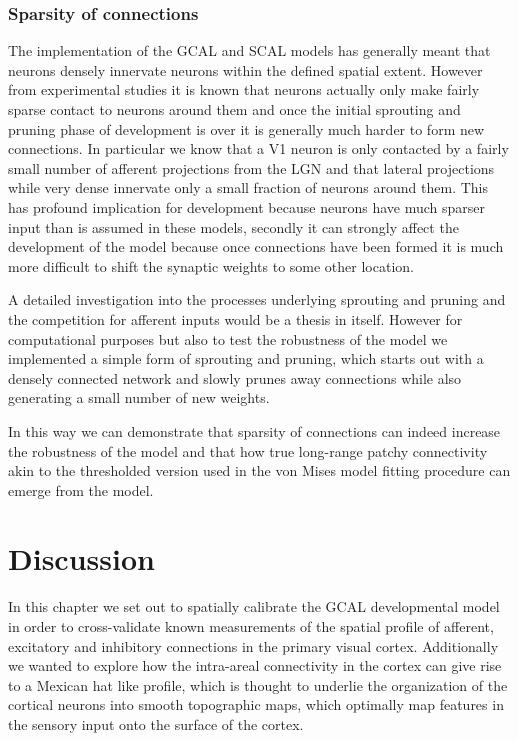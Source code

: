 \subsubsection{Sparsity of connections}

The implementation of the GCAL and SCAL models has generally meant
that neurons densely innervate neurons within the defined spatial
extent. However from experimental studies it is known that neurons
actually only make fairly sparse contact to neurons around them and
once the initial sprouting and pruning phase of development is over it
is generally much harder to form new connections. In particular we
know that a V1 neuron is only contacted by a fairly small number of
afferent projections from the LGN and that lateral projections while
very dense innervate only a small fraction of neurons around
them. This has profound implication for development because neurons
have much sparser input than is assumed in these models, secondly it
can strongly affect the development of the model because once
connections have been formed it is much more difficult to shift the
synaptic weights to some other location.

A detailed investigation into the processes underlying sprouting and
pruning and the competition for afferent inputs would be a thesis in
itself. However for computational purposes but also to test the
robustness of the model we implemented a simple form of sprouting and
pruning, which starts out with a densely connected network and slowly
prunes away connections while also generating a small number of new
weights.

In this way we can demonstrate that sparsity of connections can indeed
increase the robustness of the model and that how true long-range
patchy connectivity akin to the thresholded version used in the von
Mises model fitting procedure can emerge from the model.

\section{Discussion}

In this chapter we set out to spatially calibrate the GCAL
developmental model in order to cross-validate known measurements of
the spatial profile of afferent, excitatory and inhibitory connections
in the primary visual cortex. Additionally we wanted to explore how
the intra-areal connectivity in the cortex can give rise to a Mexican
hat like profile, which is thought to underlie the organization of the
cortical neurons into smooth topographic maps, which optimally map
features in the sensory input onto the surface of the cortex.

